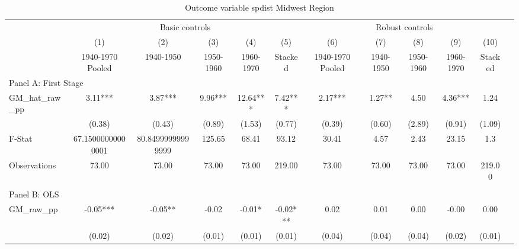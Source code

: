  \begin{table}[htbp]\centering {} \begin{threeparttable} \caption{Outcome variable spdist Midwest Region} \begin{tabular}{l*{11}{c}} \toprule
          &\multicolumn{5}{c}{Basic controls}                                   &\multicolumn{5}{c}{Robust controls}                                  \\\cmidrule(lr){2-6}\cmidrule(lr){7-11}
          &\multicolumn{1}{c}{(1)}&\multicolumn{1}{c}{(2)}&\multicolumn{1}{c}{(3)}&\multicolumn{1}{c}{(4)}&\multicolumn{1}{c}{(5)}&\multicolumn{1}{c}{(6)}&\multicolumn{1}{c}{(7)}&\multicolumn{1}{c}{(8)}&\multicolumn{1}{c}{(9)}&\multicolumn{1}{c}{(10)}\\
          &\multicolumn{1}{c}{1940-1970 Pooled}&\multicolumn{1}{c}{1940-1950}&\multicolumn{1}{c}{1950-1960}&\multicolumn{1}{c}{1960-1970}&\multicolumn{1}{c}{Stacked}&\multicolumn{1}{c}{1940-1970 Pooled}&\multicolumn{1}{c}{1940-1950}&\multicolumn{1}{c}{1950-1960}&\multicolumn{1}{c}{1960-1970}&\multicolumn{1}{c}{Stacked}\\
\cmidrule(lr){1-11}
\multicolumn{10}{l}{Panel A: First Stage}\\
\cmidrule(lr){1-11}
GM\_hat\_raw\_pp&      3.11***&      3.87***&      9.96***&     12.64***&      7.42***&      2.17***&      1.27** &      4.50   &      4.36***&      1.24   \\
          &    (0.38)   &    (0.43)   &    (0.89)   &    (1.53)   &    (0.77)   &    (0.39)   &    (0.60)   &    (2.89)   &    (0.91)   &    (1.09)   \\
\midrule
F-Stat    &67.15000000000001   &80.84999999999999   &    125.65   &     68.41   &     93.12   &     30.41   &      4.57   &      2.43   &     23.15   &       1.3   \\
Observations&     73.00   &     73.00   &     73.00   &     73.00   &    219.00   &     73.00   &     73.00   &     73.00   &     73.00   &    219.00   \\
\cmidrule[\heavyrulewidth](lr){1-11} \\ \cmidrule[\heavyrulewidth](lr){1-11}
\multicolumn{10}{l}{Panel B: OLS}\\
\cmidrule(lr){1-11}
GM\_raw\_pp &     -0.05***&     -0.05** &     -0.02   &     -0.01*  &     -0.02***&      0.02   &      0.01   &      0.00   &     -0.00   &      0.00   \\
          &    (0.02)   &    (0.02)   &    (0.01)   &    (0.01)   &    (0.01)   &    (0.04)   &    (0.04)   &    (0.04)   &    (0.02)   &    (0.01)   \\

\end{tabular}
\end{threeparttable}
\end{table}
